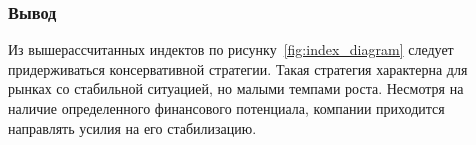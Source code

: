 \subsubsection*{Вывод}

Из вышерассчитанных индектов по рисунку~\ref{fig:index_diagram} следует придерживаться консервативной стратегии. Такая стратегия характерна для рынках со стабильной ситуацией, но малыми темпами роста. Несмотря на наличие определенного финансового потенциала, компании приходится направлять усилия на его стабилизацию.

